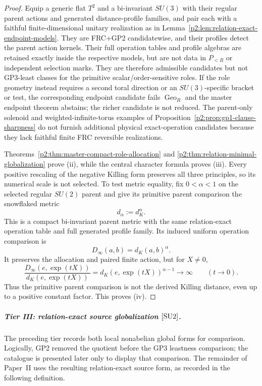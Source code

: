 \documentclass[11pt,a4paper]{article}
\begin{document}
\begin{proof}
Equip a generic flat \(T^2\) and a bi-invariant \(SU(3)\) with their regular
parent actions and generated distance-profile families, and pair each with a
faithful finite-dimensional unitary realization as in
Lemma~\ref{p2:lem:relation-exact-endpoint-models}.  They are FRC+GP2
candidatewise, and their profiles detect the parent action kernels.  Their
full operation tables and profile algebras are retained exactly inside the
respective models, but are not data in \(P_{<R}\) or independent selection
marks.  They are therefore admissible candidates but not GP3-least classes for
the primitive scalar/order-sensitive roles.  If the role geometry instead
requires a second toral direction or an \(SU(3)\)-specific bracket or test, the
corresponding endpoint candidate fails \(\operatorname{Geo}_R\) and the master
endpoint theorem abstains; the richer candidate is not reduced.  The
parent-only solenoid and
weighted-infinite-torus examples of
Proposition~\ref{p2:prop:gp1-clause-sharpness} do not furnish additional
physical exact-operation candidates because they lack faithful finite FRC
reversible realizations.

Theorems~\ref{p2:thm:master-compact-role-allocation} and
\ref{p2:thm:relation-minimal-globalization} prove (ii), while the central
character formula proves (iii).  Every positive rescaling of the negative
Killing form preserves all three principles, so its numerical scale is not
selected.  To test metric equality, fix \(0<\alpha<1\) on the selected
regular \(SU(2)\) parent and give its primitive parent comparison the
snowflaked metric
\[
 d_\alpha:=d_K^\alpha.
\]
This is a compact bi-invariant parent metric with the same relation-exact
operation table and full generated profile family.  Its induced uniform
operation comparison is
\[
 D_\infty(a,b)=d_K(a,b)^\alpha.
\]
It preserves the allocation and paired finite action, but for \(X\ne0\),
\[
 \frac{D_\infty(e,\exp(tX))}{d_K(e,\exp(tX))}
 =d_K(e,\exp(tX))^{\alpha-1}\longrightarrow\infty
 \qquad(t\to0).
\]
Thus the primitive parent comparison is not the derived Killing distance,
even up to a positive constant factor.  This proves (iv).
\end{proof}

\subparagraph{Tier III: relation-exact source globalization
\([{\rm SU2}]\).}

The preceding tier records both local nonabelian global forms for comparison.
Logically, GP2 removed the quotient before the GP3 leastness comparison; the catalogue is
presented later only to display that comparison.  The remainder of Paper~II
uses the resulting relation-exact source form, as recorded in the following
definition.
\end{document}
